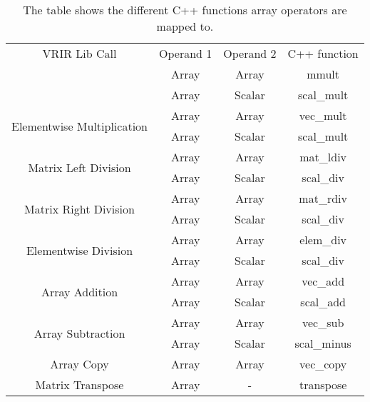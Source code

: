 					\begin{table}[htbp]
					\centering
					\begin{tabular}{|c|c|c|c|}
					\hline
					VRIR Lib Call                               & Operand 1 & Operand 2 & C++ function \\ \hhline{|=|=|=|=|}
					\multirow{2}{*}{Matrix Multiplication}      & Array     & Array     & mmult        \\ \cline{2-4} 
					& Array     & Scalar    & scal\_mult   \\ \hline
					\multirow{2}{*}{Elementwise Multiplication} & Array     & Array     & vec\_mult    \\ \cline{2-4} 
					& Array     & Scalar    & scal\_mult   \\ \hline
					\multirow{2}{*}{Matrix Left Division}       & Array     & Array     & mat\_ldiv    \\ \cline{2-4} 
					& Array     & Scalar    & scal\_div    \\ \hline
					\multirow{2}{*}{Matrix Right Division}      & Array     & Array     & mat\_rdiv    \\ \cline{2-4} 
					& Array     & Scalar    & scal\_div    \\ \hline
					\multirow{2}{*}{Elementwise Division}       & Array     & Array     & elem\_div    \\ \cline{2-4} 
					& Array     & Scalar    & scal\_div    \\ \hline
					\multirow{2}{*}{Array Addition}             & Array     & Array     & vec\_add     \\ \cline{2-4} 
					& Array     & Scalar    & scal\_add    \\ \hline
					\multirow{2}{*}{Array Subtraction}          & Array     & Array     & vec\_sub     \\ \cline{2-4} 
					& Array     & Scalar    & scal\_minus  \\ \hline
					Array Copy                                  & Array     & Array     & vec\_copy    \\ \hline
					Matrix Transpose                            & Array     & -         & transpose    \\ \hline
					\end{tabular}
					\caption[List of operations on Arrays]{The table shows the different C++ functions array operators are mapped to. }
					\label{tab:arrayOpMap}
					\end{table}
